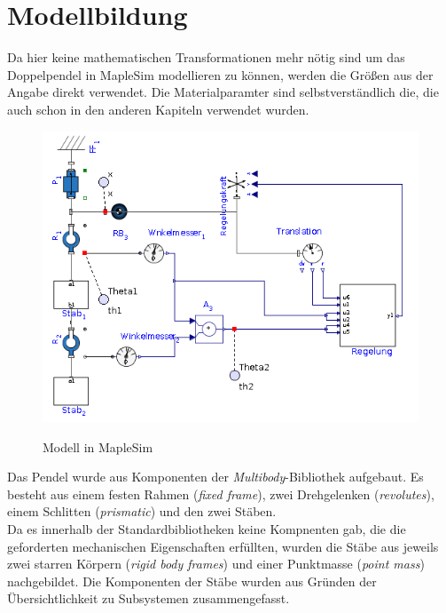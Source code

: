 \documentclass[a4paper, 10pt]{report}
\begin{document}
\section{Modellbildung}
Da hier keine mathematischen Transformationen mehr nötig sind um das Doppelpendel in MapleSim modellieren zu können, werden die Größen aus der Angabe direkt verwendet. Die Materialparamter sind selbstverständlich die, die auch schon in den anderen Kapiteln verwendet wurden. \\
\begin{figure}[h]
\centering  %
\label{MapleSimModell}
{\includegraphics[width=\textwidth]{MapleSimModel}}
\caption{Modell in MapleSim}
\end{figure}
\newpage \noindent
Das Pendel wurde aus Komponenten der \textit{Multibody}-Bibliothek aufgebaut. Es besteht aus einem festen Rahmen (\textit{fixed frame}), zwei Drehgelenken (\textit{revolutes}), einem Schlitten (\textit{prismatic}) und den zwei Stäben. \\
Da es innerhalb der Standardbibliotheken keine Kompnenten gab, die die geforderten mechanischen Eigenschaften erfüllten, wurden die Stäbe aus jeweils zwei starren Körpern (\textit{rigid body frames}) und einer Punktmasse (\textit{point mass}) nachgebildet. Die Komponenten der Stäbe wurden aus Gründen der Übersichtlichkeit zu Subsystemen zusammengefasst.
\\\\
\end{document}
